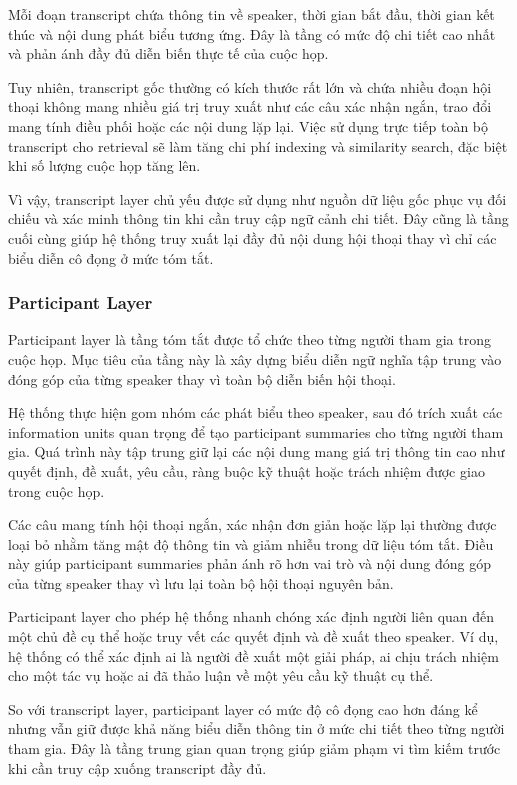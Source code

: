 Mỗi đoạn transcript chứa thông tin về speaker, thời gian bắt đầu, thời gian kết thúc và nội dung phát biểu tương ứng. Đây là tầng có mức độ chi tiết cao nhất và phản ánh đầy đủ diễn biến thực tế của cuộc họp.

Tuy nhiên, transcript gốc thường có kích thước rất lớn và chứa nhiều đoạn hội thoại không mang nhiều giá trị truy xuất như các câu xác nhận ngắn, trao đổi mang tính điều phối hoặc các nội dung lặp lại. Việc sử dụng trực tiếp toàn bộ transcript cho retrieval sẽ làm tăng chi phí indexing và similarity search, đặc biệt khi số lượng cuộc họp tăng lên.

Vì vậy, transcript layer chủ yếu được sử dụng như nguồn dữ liệu gốc phục vụ đối chiếu và xác minh thông tin khi cần truy cập ngữ cảnh chi tiết. Đây cũng là tầng cuối cùng giúp hệ thống truy xuất lại đầy đủ nội dung hội thoại thay vì chỉ các biểu diễn cô đọng ở mức tóm tắt.

\subsubsection{Participant Layer}

Participant layer là tầng tóm tắt được tổ chức theo từng người tham gia trong cuộc họp. Mục tiêu của tầng này là xây dựng biểu diễn ngữ nghĩa tập trung vào đóng góp của từng speaker thay vì toàn bộ diễn biến hội thoại.

Hệ thống thực hiện gom nhóm các phát biểu theo speaker, sau đó trích xuất các information units quan trọng để tạo participant summaries cho từng người tham gia. Quá trình này tập trung giữ lại các nội dung mang giá trị thông tin cao như quyết định, đề xuất, yêu cầu, ràng buộc kỹ thuật hoặc trách nhiệm được giao trong cuộc họp.

Các câu mang tính hội thoại ngắn, xác nhận đơn giản hoặc lặp lại thường được loại bỏ nhằm tăng mật độ thông tin và giảm nhiễu trong dữ liệu tóm tắt. Điều này giúp participant summaries phản ánh rõ hơn vai trò và nội dung đóng góp của từng speaker thay vì lưu lại toàn bộ hội thoại nguyên bản.

Participant layer cho phép hệ thống nhanh chóng xác định người liên quan đến một chủ đề cụ thể hoặc truy vết các quyết định và đề xuất theo speaker. Ví dụ, hệ thống có thể xác định ai là người đề xuất một giải pháp, ai chịu trách nhiệm cho một tác vụ hoặc ai đã thảo luận về một yêu cầu kỹ thuật cụ thể.

So với transcript layer, participant layer có mức độ cô đọng cao hơn đáng kể nhưng vẫn giữ được khả năng biểu diễn thông tin ở mức chi tiết theo từng người tham gia. Đây là tầng trung gian quan trọng giúp giảm phạm vi tìm kiếm trước khi cần truy cập xuống transcript đầy đủ.

